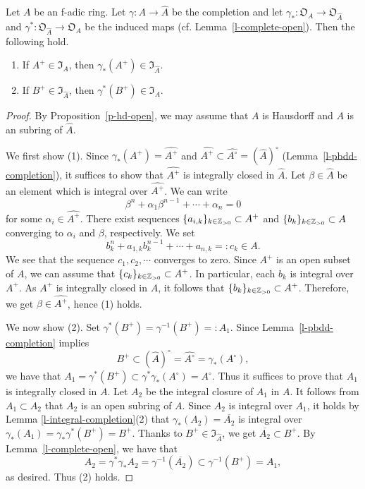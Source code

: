 \begin{lem}\label{l-complete-open3}
Let $A$ be an f-adic ring. 
Let $\gamma:A \to \widehat{A}$ be the completion and 
let $\gamma_*:\mathfrak O_A \to \mathfrak O_{\widehat{A}}$ and $\gamma^*:\mathfrak O_{\widehat{A}} \to \mathfrak O_{A}$ be 
the induced maps (cf. Lemma~\ref{l-complete-open}). 
Then the following hold. 
\begin{enumerate}
\item If $A^+ \in \mathfrak I_{A}$, then $\gamma_*(A^+) 
\in \mathfrak I_{\widehat{A}}$.
\item If $B^+ \in \mathfrak I_{\widehat{A}}$, then $\gamma^*(B^+) \in \mathfrak I_{A}$. 
\end{enumerate}
\end{lem}

\begin{proof} 
By Proposition~\ref{p-hd-open}, 
we may assume that $A$ is Hausdorff 
and $A$ is an subring of $\widehat{A}$. 

We first show (1). 
Since $\gamma_*(A^+)=\widehat{A^+}$ and 
$\widehat{A^+} \subset \widehat{A^{\circ}} =(\widehat{A})^{\circ}$ 
(Lemma~\ref{l-pbdd-completion}), 
it suffices to show that $\widehat{A^+}$ 
is integrally closed in  $\widehat{A}$. 
Let $\beta \in \widehat{A}$ be an element which is integral over $\widehat{A^+}$. 
We can write 
$$\beta^n+\alpha_1\beta^{n-1}+\cdots+\alpha_n=0$$
for some $\alpha_i \in \widehat{A^+}$. 
There exist sequences $\{a_{i, k}\}_{k \in \mathbb{Z}_{>0}}\subset A^+$ and 
$\{b_k\}_{k \in \mathbb{Z}_{>0}} \subset A$ converging to $\alpha_i$ and $\beta$, 
respectively. 
We set 
$$b_k^n+a_{1, k}b_k^{n-1}+\cdots+a_{n, k}=:c_k \in A.$$
We see that the sequence $c_1, c_2, \cdots$ converges to zero. 
Since $A^+$ is an open subset of $A$, 
we can assume that $\{c_k\}_{k \in \mathbb{Z}_{>0}} \subset A^+$. 
In particular, each $b_k$ is integral over $A^+$. 
As $A^+$ is integrally closed in $A$, 
it follows that $\{b_k\}_{k \in \mathbb{Z}_{>0}} \subset A^+$. 
Therefore, we get $\beta \in \widehat{A^+}$, hence (1) holds. 



We now show (2). 
Set $\gamma^*(B^+)=\gamma^{-1}(B^+)=:A_1$. 
Since Lemma~\ref{l-pbdd-completion} implies 
$$B^+ \subset (\widehat{A})^{\circ}=\widehat{A^{\circ}}=\gamma_*(A^{\circ}),$$
we have that $A_1=\gamma^*(B^+) \subset \gamma^*\gamma_*(A^{\circ})=A^{\circ}$. 
Thus it suffices to prove that $A_1$ is integrally closed in $A$. 
Let $A_2$ be the integral closure of $A_1$ in $A$. 
It follows from $A_1 \subset A_2$ that $A_2$ is an open subring of $A$. 
Since $A_2$ is integral over $A_1$, 
it holds by Lemma \ref{l-integral-completion}(2) that 
$\gamma_*(A_2)=\overline{A_2}$ is integral over $\gamma_*(A_1)=\gamma_*\gamma^*(B^+)=B^+$. 
Thanks to $B^+ \in \mathfrak I_{\widehat{A}}$, 
we get $\overline{A_2} \subset B^+$. 
By Lemma~\ref{l-complete-open}, we have that  
$$A_2 =\gamma^*\gamma_*A_2=\gamma^{-1}(\overline{A_2}) \subset \gamma^{-1}(B^+)=A_1,$$ 
as desired. Thus (2) holds. 
\end{proof}




